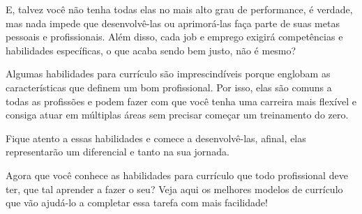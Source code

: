 \begin{commentA}
E, talvez você não tenha todas elas no mais alto grau de performance, é verdade, mas nada impede que desenvolvê-las ou aprimorá-las faça parte de suas metas pessoais e profissionais. Além disso, cada job e emprego exigirá competências e habilidades específicas, o que acaba sendo bem justo, não é mesmo?

Algumas habilidades para currículo são imprescindíveis porque englobam as características que definem um bom profissional. Por isso, elas são comuns a todas as profissões e podem fazer com que você tenha uma carreira mais flexível e consiga atuar em múltiplas áreas sem precisar começar um treinamento do zero.

Fique atento a essas habilidades e comece a desenvolvê-las, afinal, elas representarão um diferencial e tanto na sua jornada.

Agora que você conhece as habilidades para currículo que todo profissional deve ter, que tal aprender a fazer o seu? Veja aqui os melhores modelos de currículo que vão ajudá-lo a completar essa tarefa com mais facilidade!

 \par \vspace{0.1cm} \end{commentA}